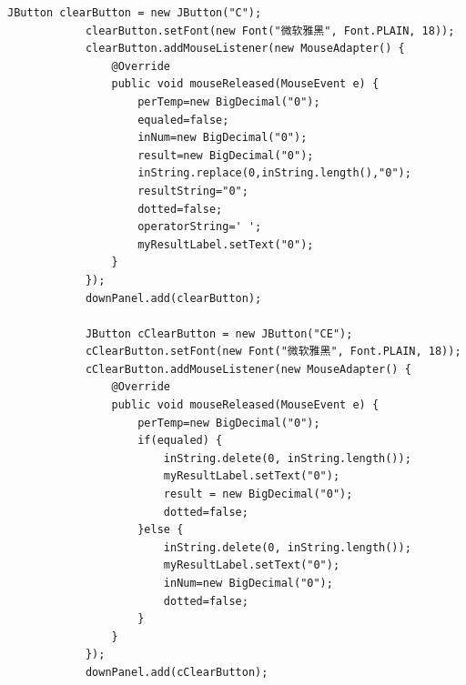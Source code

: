 \documentclass{ctexart}
\begin{document}
\begin{lstlisting}[caption=冗杂的代码]
            JButton clearButton = new JButton("C");
            clearButton.setFont(new Font("微软雅黑", Font.PLAIN, 18));
            clearButton.addMouseListener(new MouseAdapter() {
                @Override
                public void mouseReleased(MouseEvent e) {
                    perTemp=new BigDecimal("0");
                    equaled=false;
                    inNum=new BigDecimal("0");
                    result=new BigDecimal("0");
                    inString.replace(0,inString.length(),"0");
                    resultString="0";
                    dotted=false;
                    operatorString=' ';
                    myResultLabel.setText("0");
                }
            });
            downPanel.add(clearButton);
            
            JButton cClearButton = new JButton("CE");
            cClearButton.setFont(new Font("微软雅黑", Font.PLAIN, 18));
            cClearButton.addMouseListener(new MouseAdapter() {
                @Override
                public void mouseReleased(MouseEvent e) {
                    perTemp=new BigDecimal("0");
                    if(equaled) {
                        inString.delete(0, inString.length());
                        myResultLabel.setText("0");
                        result = new BigDecimal("0");
                        dotted=false;
                    }else {
                        inString.delete(0, inString.length());
                        myResultLabel.setText("0");
                        inNum=new BigDecimal("0");
                        dotted=false;
                    }		
                }
            });
            downPanel.add(cClearButton);
            

\end{lstlisting}
\end{document}
